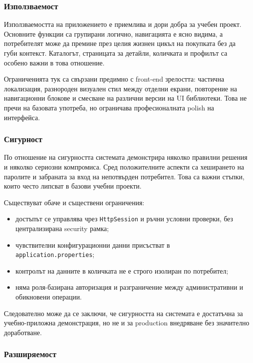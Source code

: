 \subsubsection{Използваемост}

Използваемостта на приложението е приемлива и дори добра за учебен проект. Основните функции са групирани логично, навигацията е ясно видима, а потребителят може да премине през целия жизнен цикъл на покупката без да губи контекст. Каталогът, страницата за детайли, количката и профилът са особено важни в това отношение.

Ограниченията тук са свързани предимно с front-end зрелостта: частична локализация, разнороден визуален стил между отделни екрани, повторение на навигационни блокове и смесване на различни версии на UI библиотеки. Това не пречи на базовата употреба, но ограничава професионалната polish на интерфейса.

\subsubsection{Сигурност}

По отношение на сигурността системата демонстрира няколко правилни решения и няколко сериозни компромиса. Сред положителните аспекти са хеширането на паролите и забраната за вход на непотвърден потребител. Това са важни стъпки, които често липсват в базови учебни проекти.

Съществуват обаче и съществени ограничения:

\begin{itemize}[leftmargin=*]
    \item достъпът се управлява чрез \texttt{HttpSession} и ръчни условни проверки, без централизирана security рамка;
    \item чувствителни конфигурационни данни присъстват в \texttt{application.properties};
    \item контролът на данните в количката не е строго изолиран по потребител;
    \item няма роля-базирана авторизация и разграничение между административни и обикновени операции.
\end{itemize}

Следователно може да се заключи, че сигурността на системата е достатъчна за учебно-приложна демонстрация, но не и за production внедряване без значително доработване.

\subsubsection{Разширяемост}

